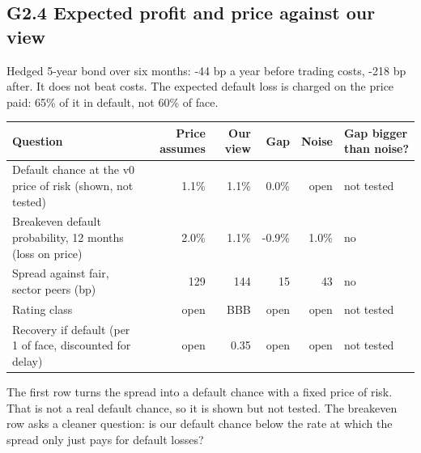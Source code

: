 \documentclass[11pt,a4paper]{article}
\begin{document}
\subsection*{G2.4 Expected profit and price against our view}
Hedged 5-year bond over six months: -44 bp a year before trading costs, -218 bp after. It does not beat costs. The expected default loss is charged on the price paid: 65\% of it in default, not 60\% of face.
\begin{center}\footnotesize\setlength{\tabcolsep}{3.5pt}\begin{tabular}{@{}p{5.2cm}rrrrl@{}}\toprule
Question & Price assumes & Our view & Gap & Noise & Gap bigger than noise? \\\midrule
Default chance at the v0 price of risk (shown, not tested) & 1.1\% & 1.1\% & 0.0\% & open & not tested \\
Breakeven default probability, 12 months (loss on price) & 2.0\% & 1.1\% & -0.9\% & 1.0\% & no \\
Spread against fair, sector peers (bp) & 129 & 144 & 15 & 43 & no \\
Rating class & open & BBB & open & open & not tested \\
Recovery if default (per 1 of face, discounted for delay) & open & 0.35 & open & open & not tested \\
\bottomrule\end{tabular}\end{center}
The first row turns the spread into a default chance with a fixed price of risk. That is not a real default chance, so it is shown but not tested. The breakeven row asks a cleaner question: is our default chance below the rate at which the spread only just pays for default losses?
\end{document}
